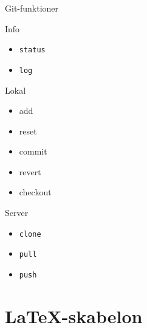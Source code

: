 \documentclass[10pt]{beamer}
\begin{document}
\begin{frame}{Git-funktioner}
  \begin{minipage}[t]{0.3\textwidth}
    \begin{block}{Info}
      \begin{itemize}
      \item \texttt{status}
      \item \texttt{log}
      \end{itemize}
    \end{block}
  \end{minipage}
  \begin{minipage}[t]{0.3\textwidth}
    \begin{block}{Lokal}
      \begin{itemize}
        \ttfamily
      \item add
      \item reset
      \item commit
      \item revert
      \item checkout
      \end{itemize}
    \end{block}
  \end{minipage}
  \begin{minipage}[t]{0.3\textwidth}
    \begin{block}{Server}
      \begin{itemize}
      \item \texttt{clone}
      \item \texttt{pull}
      \item \texttt{push}
      \end{itemize}
    \end{block}
  \end{minipage}
\end{frame}

\section{\LaTeX-skabelon}
\label{sec:template}
\end{document}
